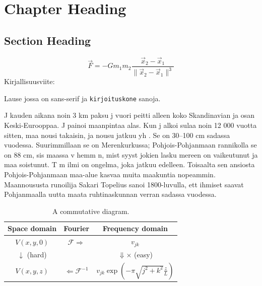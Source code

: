 \documentclass{article}
\begin{document}
\chapter{Chapter Heading}
\section{Section Heading}
\[
\vec{F}=-G m_1 m_2 \frac{\vec{x}_2-\vec{x}_1}{\lVert{\vec{x}_2-\vec{x}_1}\rVert^3}
\]
\lipsum[1-2]
Kirjallisuusviite: \cite{Knuth1984:The-TeXbook}

Lause jossa on \textsf{sans-serif} ja \texttt{kirjoituskone} sanoja.

J kauden aikana noin 3 km paksu j vuori peitti alleen koko Skandinavian ja
osan Keski-Eurooppaa. J  painoi maanpintaa alas. Kun j  alkoi sulaa noin 12
000 vuotta sitten, maa nousi takaisin, ja nousu jatkuu yh . Se on 30--100 cm
sadassa vuodessa. Suurimmillaan se on Merenkurkussa; Pohjois-Pohjanmaan
rannikolla se on 88 cm, sis maassa v hemm n, mist  syyst  jokien lasku mereen
on vaikeutunut ja maa soistunut. T m  ilmi  on ongelma, joka jatkuu edelleen.
Toisaalta sen ansiosta Pohjois-Pohjanmaan maa-alue kasvaa muita maakuntia
nopeammin. Maannoususta runoilija Sakari Topelius sanoi 1800-luvulla, ett 
ihmiset saavat Pohjanmaalla uutta maata ruhtinaskunnan verran sadassa vuodessa.

\begin{table}
\caption{A commutative diagram.}
\begin{tabular}{ccc}
\hline
Space domain & Fourier & Frequency domain\tabularnewline
\hline
$V\left(x,y,0\right)$ & $\mathcal{F}\Longrightarrow$ & $v_{jk}$\tabularnewline
$\downarrow$ (hard) &  & $\Downarrow\times$ (easy)\tabularnewline
$V\left(x,y,z\right)$ & $\Longleftarrow\mathcal{F}^{-1}$ & $v_{jk}\exp\left(-\pi\sqrt{j^{2}+k^{2}}\frac{z}{L}\right)$\tabularnewline
\hline
\end{tabular}
\end{table}
\end{document}
